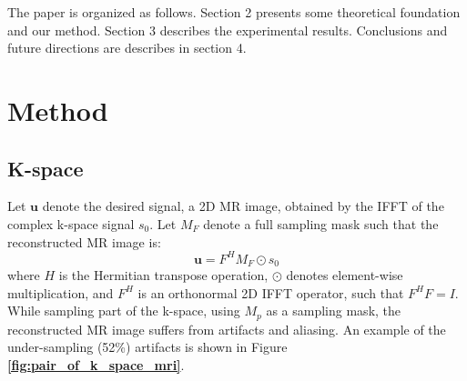 \documentclass[review]{elsarticle}
\begin{document}
The paper is organized as follows. Section 2 presents some theoretical
foundation and our method. Section 3 describes the experimental results.
Conclusions and future directions are describes in section 4.

\section{Method}

\subsection{K-space}
Let $\bm{u}$ denote the desired signal, a 2D MR image, obtained
by the IFFT of the complex k-space signal $s_{0}$. Let $M_{F}$ denote
a full sampling mask such that the reconstructed MR image is: 
\begin{equation}
\bm{u}=F^{H}M_{F}\odot s_{0}
\end{equation}
where $H$ is the Hermitian transpose operation, $\odot$ denotes
element-wise multiplication, and $F^{H}$ is an orthonormal 2D IFFT
operator, such that $F^{H}F=I$. While sampling part of the k-space,
using $M_{p}$ as a sampling mask, the reconstructed MR image suffers
from artifacts and aliasing. An example of the under-sampling (52\%)
artifacts is shown in Figure \textbf{\ref{fig:pair_of_k_space_mri}}.
\end{document}

